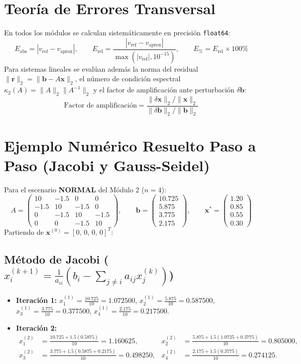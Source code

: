 \documentclass[11pt,a4paper]{article}
\begin{document}
\section{Teoría de Errores Transversal}
En todos los módulos se calculan sistemáticamente en precisión \texttt{float64}:
\[
    E_{\text{abs}} = |v_{\text{ref}} - v_{\text{aprox}}|, \qquad
    E_{\text{rel}} = \frac{|v_{\text{ref}} - v_{\text{aprox}}|}{\max(|v_{\text{ref}}|, 10^{-15})}, \qquad
    E_{\%} = E_{\text{rel}} \times 100\%
\]
Para sistemas lineales se evalúan además la norma del residual $\|\mathbf{r}\|_2 = \|\mathbf{b} - A\mathbf{x}\|_2$, el número de condición espectral $\kappa_2(A) = \|A\|_2 \|A^{-1}\|_2$ y el factor de amplificación ante perturbación $\delta\mathbf{b}$:
\[
    \text{Factor de amplificación} = \frac{\|\delta\mathbf{x}\|_2 / \|\mathbf{x}\|_2}{\|\delta\mathbf{b}\|_2 / \|\mathbf{b}\|_2}
\]

\section{Ejemplo Numérico Resuelto Paso a Paso (Jacobi y Gauss-Seidel)}
Para el escenario \textbf{NORMAL} del Módulo 2 ($n=4$):
\[
A = \begin{pmatrix}
10 & -1.5 & 0 & 0 \\
-1.5 & 10 & -1.5 & 0 \\
0 & -1.5 & 10 & -1.5 \\
0 & 0 & -1.5 & 10
\end{pmatrix}, \qquad
\mathbf{b} = \begin{pmatrix} 10.725 \\ 5.875 \\ 3.775 \\ 2.175 \end{pmatrix}, \qquad
\mathbf{x}^* = \begin{pmatrix} 1.20 \\ 0.85 \\ 0.55 \\ 0.30 \end{pmatrix}
\]
Partiendo de $\mathbf{x}^{(0)} = [0,\, 0,\, 0,\, 0]^T$:

\subsection{Método de Jacobi ($x_i^{(k+1)} = \frac{1}{a_{ii}}(b_i - \sum_{j\ne i} a_{ij}x_j^{(k)})$)}
\begin{itemize}
    \item \textbf{Iteración 1:}
    $x_1^{(1)} = \frac{10.725}{10} = 1.072500$, \;
    $x_2^{(1)} = \frac{5.875}{10} = 0.587500$, \;
    $x_3^{(1)} = \frac{3.775}{10} = 0.377500$, \;
    $x_4^{(1)} = \frac{2.175}{10} = 0.217500$.
    \item \textbf{Iteración 2:}
    \begin{align*}
        x_1^{(2)} &= \frac{10.725 + 1.5(0.5875)}{10} = 1.160625, &
        x_2^{(2)} &= \frac{5.875 + 1.5(1.0725 + 0.3775)}{10} = 0.805000, \\
        x_3^{(2)} &= \frac{3.775 + 1.5(0.5875 + 0.2175)}{10} = 0.498250, &
        x_4^{(2)} &= \frac{2.175 + 1.5(0.3775)}{10} = 0.274125.
    \end{align*}
\end{itemize}
\end{document}
